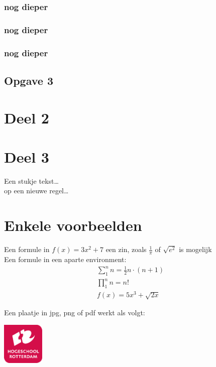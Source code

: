 \documentclass{article}
\begin{document}
\subsubsection{nog dieper}
\subsubsection{nog dieper}
\subsubsection{nog dieper}
\subsection{Opgave 3}
\section{Deel 2}
\section{Deel 3}
Een stukje tekst\ldots \\
op een nieuwe regel\ldots 
\section{Enkele voorbeelden}
Een formule in $f(x)=3x^2+7$ een zin, zoals $\frac{1}{\pi}$ of $\sqrt{e^{2}}$ is mogelijk\\
Een formule in een aparte environment:
 \begin{eqnarray}
   \sum_{1}^{n}n=\frac{1}{2}n\cdot(n+1)\\
   \prod_{1}^{n}n=n!\\
   f(x)=5x^3+\sqrt{2x}
 \end{eqnarray}
 
Een plaatje in jpg, png of pdf werkt als volgt:
 \begin{center}
\includegraphics[width=2cm]{logohr}
\end{center}
\end{document}
